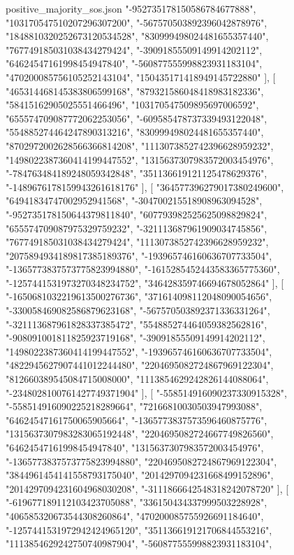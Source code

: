 \begin{filecontents*}[overwrite]{positive_majority_sos.json}
    "-952735178150586784677888",
    "103170547510207296307200",
    "-567570503892396042878976",
    "1848810320252673120534528",
    "830999498024481655357440",
    "767749185031038434279424",
    "-39091855509149914202112",
    "64624547161998454947840",
    "-560877555998823931183104",
    "470200085756105252143104",
    "150435171418949145722880"
   ],
   [
    "465314468145383806599168",
    "879321586048418983182336",
    "58415162905025551466496",
    "103170547509895697006592",
    "655574709087772062253056",
    "-609585478737339493122048",
    "554885274464247890313216",
    "830999498024481655357440",
    "8702972002628566366814208",
    "1113073852742396628959232",
    "1498022387360414199447552",
    "1315637307983572003454976",
    "-784763484189248059342848",
    "351136619121125478629376",
    "-1489676178159943261618176"
   ],
   [
    "364577396279017380249600",
    "64941834747002952941568",
    "-304700215518908963094528",
    "-952735178150644379811840",
    "607793982525625098829824",
    "655574709087975329759232",
    "-321113687961909034745856",
    "767749185031038434279424",
    "1113073852742396628959232",
    "2075894934189817385189376",
    "-193965746160636707733504",
    "-1365773837573775823994880",
    "-1615285452443583365775360",
    "-1257441531973270348234752",
    "346428359746694678052864"
   ],
   [
    "-1650681032219613500276736",
    "371614098112048090054656",
    "-330058469082586879623168",
    "-567570503892371336331264",
    "-321113687961828337385472",
    "554885274464059382562816",
    "-908091001811825923719168",
    "-39091855509149914202112",
    "1498022387360414199447552",
    "-193965746160636707733504",
    "4822945627907441012244480",
    "2204695082724867969122304",
    "812660389545084715008000",
    "1113854629242826144088064",
    "-2348028100761427749371904"
   ],
   [
    "-558514916090237330915328",
    "-558514916090225218289664",
    "72166810030503947993088",
    "64624547161750065905664",
    "-1365773837573596460875776",
    "1315637307983283065192448",
    "2204695082724667749826560",
    "64624547161998454947840",
    "1315637307983572003454976",
    "-1365773837573775823994880",
    "2204695082724867969122304",
    "3844961454141558793175040",
    "2014297094231668499152896",
    "2014297094231604968030208",
    "-3111866642548318242078720"
   ],
   [
    "-619677189112103423705088",
    "336150434337999503228928",
    "406585320673544308260864",
    "470200085755926691184640",
    "-1257441531972942424965120",
    "351136619121706844553216",
    "1113854629242750740987904",
    "-560877555998823931183104",

\end{filecontents*}
